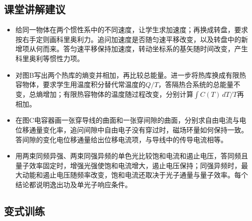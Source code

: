 \documentclass[UTF8,fontset=fandol,a4paper,11pt]{ctexart}
\begin{document}


\subsection*{课堂讲解建议}

\begin{itemize}
\item 给同一物体在两个惯性系中的不同速度，让学生求加速度；再换成转盘，要求按右手定则画科里奥利力。追问加速度是否随匀速平移改变，以及转盘中的新增项从何而来。答匀速平移保持加速度，转动坐标系的基矢随时间改变，产生科里奥利等惯性力项。
\item 对图B写出两个热库的熵变并相加，再比较总能量。进一步将热库换成有限热容物体，要求学生用温度积分替代常温度的$Q/T$，答隔热合系统的总能量不变，总熵增加；有限热容物体的温度随过程改变，分别计算$\int C(T)\,dT/T$再相加。
\item 在图C电容器画一张穿导线的曲面和一张穿间隙的曲面，分别求自由电流与电位移通量变化率，追问间隙中自由电子没有穿过时，磁场环量如何保持一致。答间隙的变化电位移通量给出位移电流项，与导线中的传导电流相等。
\item 用两束同频异强、两束同强异频的单色光比较饱和电流和遏止电压，答同频且量子效率固定时，增强光强使饱和电流增大，遏止电压保持；同强异频时，最大动能和遏止电压随频率改变，饱和电流还取决于光子通量与量子效率。每个结论都说明逸出功及单光子响应条件。
\end{itemize}



\subsection*{变式训练}
\end{document}
